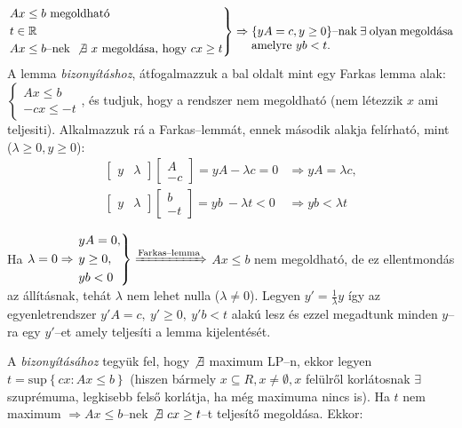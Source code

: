 \[
\begin{rcases}
Ax \leq b \mbox{ megoldható} \\
t \in \mathbb{R} \\
Ax \leq b \mbox{--nek } \not \exists~x \mbox{ megoldása, hogy } cx \geq t
\end{rcases} \Rightarrow
\parbox[t]{6cm}{
$\{yA=c, y \geq 0\}$--nak $\exists$ olyan megoldása amelyre  $yb < t$.}
\] A lemma \emph{bizonyításhoz}, átfogalmazzuk a bal oldalt mint egy Farkas
lemma alak:
$\begin{cases} Ax \leq b \\
-cx \leq -t \end{cases}$, és tudjuk, hogy a rendszer nem megoldható (nem
létezzik $x$ ami teljesiti). Alkalmazzuk rá a Farkas--lemmát, ennek második
alakja felírható, mint ($\lambda \geq 0, y
\geq 0$):
\begin{align*}
\begin{bmatrix} y & \lambda\end{bmatrix}
\begin{bmatrix} A \\ -c \end{bmatrix} = yA - \lambda c = 0 &\Rightarrow 
yA = \lambda c, \\
\begin{bmatrix} y & \lambda\end{bmatrix}
\begin{bmatrix} b \\ -t \end{bmatrix} =yb~ - \lambda t < 0 &\Rightarrow 
yb < \lambda t
\end{align*}

Ha $\lambda=0 \Rightarrow \begin{rcases}
yA = 0, \\
y \geq 0, \\
yb <  0 \end{rcases} \xRightarrow{\text{Farkas--lemma}}$ $Ax \leq b$ nem
megoldható, de ez ellentmondás az állításnak, tehát $\lambda$ nem lehet nulla
($\lambda \neq 0$). Legyen $y'=\frac{1}{\lambda}y$ így az egyenletrendszer
$y'A=c,~y'\geq0,~y'b<t$ alakú lesz és ezzel megadtunk minden $y$--ra egy
$y'$--et amely teljesíti a lemma kijelentését.

A  \emph{bizonyításához} tegyük fel, hogy $\not \exists$ maximum
LP--n, ekkor legyen $t=\mbox{sup}\left\{cx:Ax \leq b \right\}$ (hiszen bármely
$x \subseteq R, x \neq \emptyset, x$ felülről korlátosnak $\exists$ szuprémuma,
legkisebb felső korlátja, ha még maximuma nincs is). Ha $t$ nem maximum
$\Rightarrow Ax \leq b$--nek $\not \exists~cx \geq t$--t teljesítő megoldása.
Ekkor:

